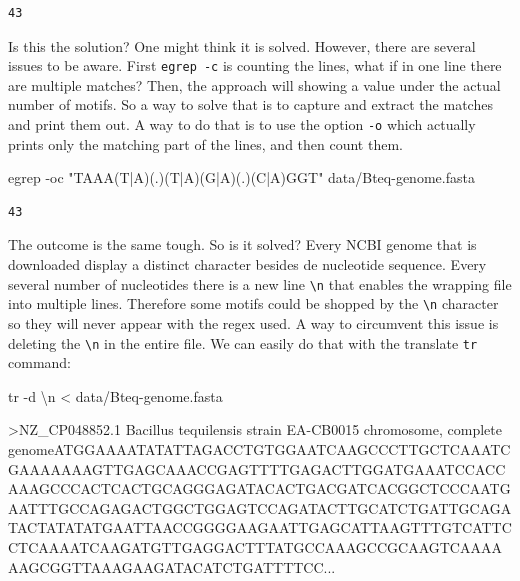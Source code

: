 \documentclass[
  letterpaper,
  DIV=11,
  numbers=noendperiod,
  oneside]{scrreprt}
\newenvironment{Shaded}{\begin{snugshade}}{\end{snugshade}}
\newcommand{\AttributeTok}[1]{\textcolor[rgb]{0.40,0.45,0.13}{#1}}
\newcommand{\ExtensionTok}[1]{\textcolor[rgb]{0.00,0.23,0.31}{#1}}
\newcommand{\FunctionTok}[1]{\textcolor[rgb]{0.28,0.35,0.67}{#1}}
\newcommand{\NormalTok}[1]{\textcolor[rgb]{0.00,0.23,0.31}{#1}}
\newcommand{\OperatorTok}[1]{\textcolor[rgb]{0.37,0.37,0.37}{#1}}
\newcommand{\StringTok}[1]{\textcolor[rgb]{0.13,0.47,0.30}{#1}}
\begin{document}
\begin{verbatim}
43
\end{verbatim}

Is this the solution? One might think it is solved. However, there are
several issues to be aware. First \texttt{egrep\ -c} is counting the
lines, what if in one line there are multiple matches? Then, the
approach will showing a value under the actual number of motifs. So a
way to solve that is to capture and extract the matches and print them
out. A way to do that is to use the option \texttt{-o} which actually
prints only the matching part of the lines, and then count them.

\begin{Shaded}
\begin{Highlighting}[]
\FunctionTok{egrep} \AttributeTok{{-}oc} \StringTok{"TAAA(T|A)(.)(T|A)(G|A)(.)(C|A)GGT"}\NormalTok{ data/Bteq{-}genome.fasta}
\end{Highlighting}
\end{Shaded}

\begin{verbatim}
43
\end{verbatim}

The outcome is the same tough. So is it solved? Every NCBI genome that
is downloaded display a distinct character besides de nucleotide
sequence. Every several number of nucleotides there is a new line
\texttt{\textbackslash{}n} that enables the wrapping file into multiple
lines. Therefore some motifs could be shopped by the
\texttt{\textbackslash{}n} character so they will never appear with the
regex used. A way to circumvent this issue is deleting the
\texttt{\textbackslash{}n} in the entire file. We can easily do that
with the translate \texttt{tr} command:

\begin{Shaded}
\begin{Highlighting}[]
\FunctionTok{tr} \AttributeTok{{-}d} \StringTok{\textquotesingle{}\textbackslash{}n\textquotesingle{}} \OperatorTok{\textless{}}\NormalTok{ data/Bteq{-}genome.fasta}
\end{Highlighting}
\end{Shaded}

\begin{Shaded}
\begin{Highlighting}[]
\OperatorTok{\textgreater{}}\NormalTok{NZ\_CP048852.1 }\ExtensionTok{Bacillus}\NormalTok{ tequilensis strain EA{-}CB0015 chromosome, complete genomeATGGAAAATATATTAGACCTGTGGAATCAAGCCCTTGCTCAAATCGAAAAAAAGTTGAGCAAACCGAGTTTTGAGACTTGGATGAAATCCACCAAAGCCCACTCACTGCAGGGAGATACACTGACGATCACGGCTCCCAATGAATTTGCCAGAGACTGGCTGGAGTCCAGATACTTGCATCTGATTGCAGATACTATATATGAATTAACCGGGGAAGAATTGAGCATTAAGTTTGTCATTCCTCAAAATCAAGATGTTGAGGACTTTATGCCAAAGCCGCAAGTCAAAAAAGCGGTTAAAGAAGATACATCTGATTTTCC...}
\end{Highlighting}
\end{Shaded}
\end{document}
